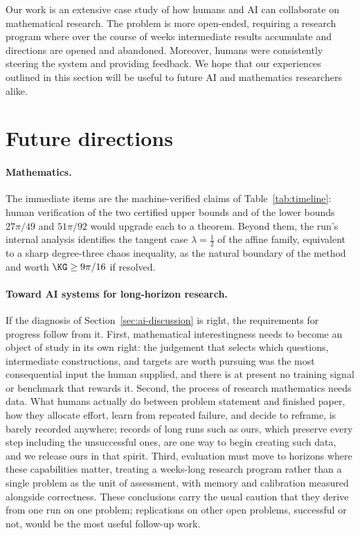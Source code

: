 Our work is an extensive case study of how humans and AI can collaborate
on mathematical research. The problem is more open-ended, requiring a
research program where over the course of weeks intermediate results
accumulate and directions are opened and abandoned. Moreover, humans were
consistently steering the system and providing feedback. We hope that our
experiences outlined in this section will be useful to future AI and mathematics researchers alike.

\section{Future directions}
\label{sec:ai-future}

\paragraph{Mathematics.}
The immediate items are the machine-verified claims of
Table~\ref{tab:timeline}: human verification of the two certified upper
bounds and of the lower bounds $27\pi/49$ and $51\pi/92$ would upgrade each
to a theorem. Beyond them, the run's internal analysis identifies the
tangent case $\lambda=\tfrac12$ of the affine family, equivalent to a sharp
degree-three chaos inequality, as the natural boundary of the method and
worth $\KG\ge9\pi/16$ if resolved.

\paragraph{Toward AI systems for long-horizon research.}
If the diagnosis of Section~\ref{sec:ai-discussion} is right, the
requirements for progress follow from it. First, mathematical
interestingness needs to become an object of study in its own right: the
judgement that selects which questions, intermediate constructions, and
targets are worth pursuing was the most consequential input the human
supplied, and there is at present no training signal or benchmark that
rewards it. Second, the process of research mathematics needs data. What
humans actually do between problem statement and finished paper,
how they allocate effort, learn from repeated failure, and decide to
reframe, is barely recorded anywhere; records of long runs such as ours,
which preserve every step including the unsuccessful ones, are one way to
begin creating such data, and we release ours in that spirit. Third,
evaluation must move to horizons where these capabilities matter, treating
a weeks-long research program rather than a single problem as the unit of
assessment, with memory and calibration measured alongside correctness.
These conclusions carry the usual caution that they derive from one run on
one problem; replications on other open problems, successful or not, would
be the most useful follow-up work.

